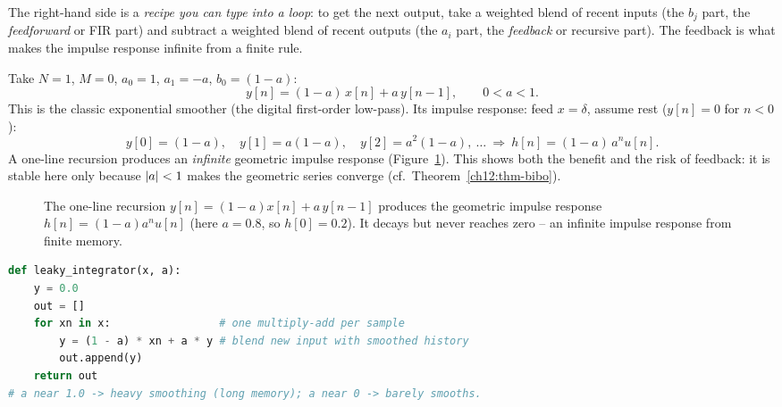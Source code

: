 The right-hand side is a \emph{recipe you can type into a loop}: to get the next
output, take a weighted blend of recent inputs (the $b_j$ part, the
\emph{feedforward} or FIR part) and subtract a weighted blend of recent outputs
(the $a_i$ part, the \emph{feedback} or recursive part). The feedback is what
makes the impulse response infinite from a finite rule.

\begin{example}
\label{ch12:leaky}
Take $N=1$, $M=0$, $a_0=1$, $a_1=-a$, $b_0=(1-a)$:
\[
  y[n] = (1-a)\,x[n] + a\,y[n-1], \qquad 0<a<1.
\]
This is the classic exponential smoother (the digital first-order low-pass).
Its impulse response: feed $x=\delta$, assume rest ($y[n]=0$ for $n<0$):
\[
  y[0]=(1-a),\quad y[1]=a(1-a),\quad y[2]=a^2(1-a),\ \dots\ \Rightarrow\
  h[n]=(1-a)\,a^n u[n].
\]
A one-line recursion produces an \emph{infinite} geometric impulse response
(Figure~\ref{ch12:fig-leaky-impulse}).
This shows both the benefit and the risk of feedback: it is stable here only
because $\lvert a\rvert<1$ makes the geometric series converge (cf.\
Theorem~\ref{ch12:thm-bibo}).
\end{example}

\begin{figure}[H]
\centering
{}
\caption{The one-line recursion $y[n]=(1-a)x[n]+a\,y[n-1]$ produces the
geometric impulse response $h[n]=(1-a)a^n u[n]$ (here $a=0.8$, so
$h[0]=0.2$). It decays but never reaches zero -- an infinite impulse
response from finite memory.}
\label{ch12:fig-leaky-impulse}
\end{figure}

\begin{lstlisting}[language=Python,caption={The leaky integrator in a loop -- the cheapest useful real-time filter.}]
def leaky_integrator(x, a):
    y = 0.0
    out = []
    for xn in x:                 # one multiply-add per sample
        y = (1 - a) * xn + a * y # blend new input with smoothed history
        out.append(y)
    return out
# a near 1.0 -> heavy smoothing (long memory); a near 0 -> barely smooths.
\end{lstlisting}

